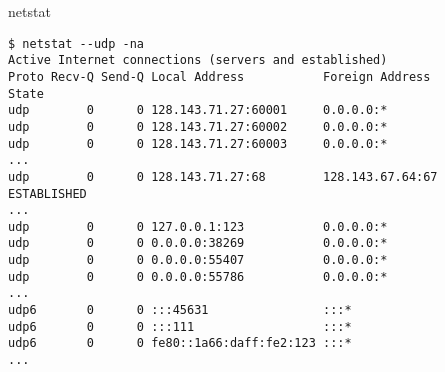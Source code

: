 \begin{frame}[fragile]{netstat}
\begin{Verbatim}[fontsize=\fontsize{9}{10}]
$ netstat --udp -na
Active Internet connections (servers and established)
Proto Recv-Q Send-Q Local Address           Foreign Address         State      
udp        0      0 128.143.71.27:60001     0.0.0.0:*                          
udp        0      0 128.143.71.27:60002     0.0.0.0:*                          
udp        0      0 128.143.71.27:60003     0.0.0.0:*                          
...
udp        0      0 128.143.71.27:68        128.143.67.64:67        ESTABLISHED
...
udp        0      0 127.0.0.1:123           0.0.0.0:*                          
udp        0      0 0.0.0.0:38269           0.0.0.0:*                          
udp        0      0 0.0.0.0:55407           0.0.0.0:*                          
udp        0      0 0.0.0.0:55786           0.0.0.0:*                          
...
udp6       0      0 :::45631                :::*                               
udp6       0      0 :::111                  :::*                               
udp6       0      0 fe80::1a66:daff:fe2:123 :::*                               
...
\end{Verbatim}
\end{frame}
